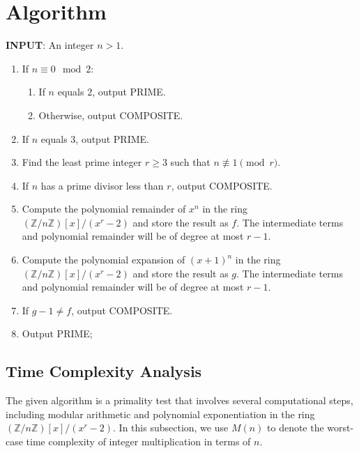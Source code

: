 \documentclass{article}
\theoremstyle{plain}
\theoremstyle{definition}
\newcommand{\Z}{\mathbb{Z}}
\begin{document}
\section{Algorithm} \label{section:algorithm}
\textbf{INPUT}: An integer $n > 1$.
\begin{center}
    \begin{enumerate}
        \item If $n \equiv 0 \mod{2}$:
            \begin{enumerate}
                \item If $n$ equals $2$, output PRIME.
                \item Otherwise, output COMPOSITE.
            \end{enumerate}
        \item If $n$ equals $3$, output PRIME.
        \item Find the least prime integer $r \geq 3$ such that $n \not\equiv 1 \pmod{r}$.
        \item If $n$ has a prime divisor less than $r$, output COMPOSITE.
        \item Compute the polynomial remainder of $x^n$ in the ring $(\Z/n\Z)[x]/(x^r-2)$ and store the result as $f$. The intermediate terms and polynomial remainder will be of degree at most $r-1$.
        \item Compute the polynomial expansion of $(x+1)^n$ in the ring $(\Z/n\Z)[x]/(x^r-2)$ and store the result as $g$. The intermediate terms and polynomial remainder will be of degree at most $r-1$.
        \item If $g-1 \not= f$, output COMPOSITE.
        \item Output PRIME;
    \end{enumerate}
\end{center}

\subsection{Time Complexity Analysis} \label{subsection:timecomplexity}
The given algorithm is a primality test that involves several computational steps, including modular arithmetic and polynomial exponentiation in the ring $(\Z/n\Z)[x]/(x^r-2)$. In this subsection, we use $M(n)$ to denote the worst-case time complexity of integer multiplication in terms of $n$.
\end{document}
